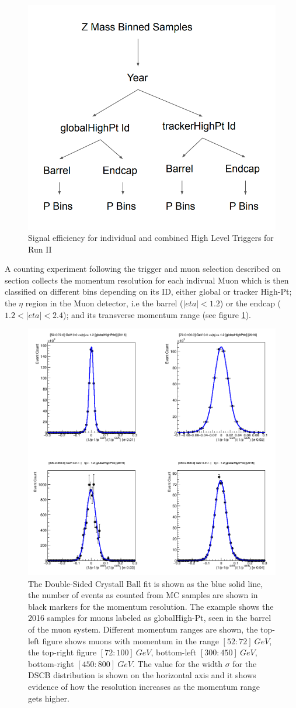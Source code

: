 \begin{figure}[tph]
  \centering
  \includegraphics[width=.5\textwidth]{fig/MomentumResolution/MomentumResolutionBins.png}
  \caption{Signal efficiency for individual and combined High Level Triggers for Run II}
  \label{fig:MomentumResolutionBins}
\end{figure}

A counting experiment following the trigger and muon selection described on
section %
collects the momentum resolution for each indivual Muon which is then classified
on different bins depending on its ID, either global or tracker High-Pt; the $\eta$
region in the Muon detector, i.e the barrel ($\lvert eta\lvert< 1.2$) or
the endcap ($1.2 < \lvert eta \lvert < 2.4$); and its transverse momentum range
(see figure \ref{fig:MomentumResolutionBins}).


\begin{figure}[tph]
  \centering
  \includegraphics[width=.7\textwidth]{fig/MomentumResolution/DSCB_Example.png}
  \caption{
    The Double-Sided Crystall Ball fit is shown as the blue solid line,
    the number of events as counted from MC samples are shown in black markers for
    the momentum resolution. The example shows the 2016 samples for muons labeled
    as globalHigh-Pt, seen in the barrel of the muon system. Different momentum
    ranges are shown, the
    top-left figure shows muons with momentum in the range $[52:72]~GeV$,
    the top-right figure $[72:100]~GeV$, bottom-left $[300:450]~GeV$,
    bottom-right $[450:800]~GeV$. The value for the width $\sigma$ for the DSCB
    distribution is shown on the horizontal axis and it shows evidence of how
    the resolution increases as the momentum range gets higher.
  }
  \label{fig:DSCB_Fit_Example}
\end{figure}

